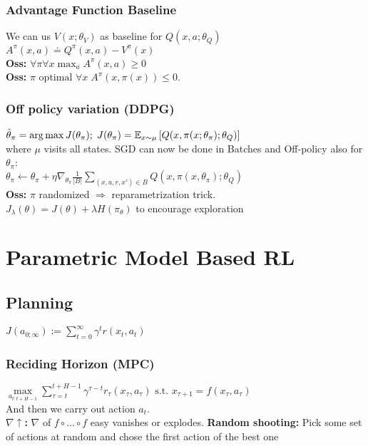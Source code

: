 \subsubsection{Advantage Function Baseline}
We can us $V(x;\theta_V)$ as baseline for $Q(x,a;\theta_Q)$\\
$A^\pi(x,a) \doteq Q^\pi(x,a)-V^\pi(x)$\\
\textbf{Oss:} $\forall\pi \forall x \max_a A^\pi(x,a)\geq 0$\\
\textbf{Oss:} $\pi \text{ optimal } \forall x  \;A^\pi(x,\pi(x))\leq 0$.

\subsubsection{Off policy variation (DDPG)}
{\scriptsize $\hat{\theta}_\pi = \operatorname*{arg\,max} J(\theta_\pi); \; J(\theta_\pi)=\mathbb{E}_{x\sim\mu}\left[Q(x,\pi(x;\theta_\pi);\theta_Q)\right]$}\\
where $\mu$ visits all states. SGD can now be done in Batches and Off-policy also for $\theta_\pi$:\\
$\theta_\pi \gets \theta_\pi + \eta \nabla_{\theta_\pi} \frac{1}{|B|}\sum_{(x,a,r,x')\in B}Q(x,\pi(x,\theta_\pi);\theta_Q)$\\
\textbf{Oss:}
$\pi$ randomized $\Rightarrow$ reparametrization trick.\\
$J_\lambda (\theta) = J(\theta) + \lambda H(\pi_\theta)$ to encourage exploration


\section{Parametric Model Based RL}


\subsection{Planning}
$J(a_{0:\infty}) := \sum_{t=0}^\infty \gamma^t r(x_t,a_t)$

\subsubsection{Reciding Horizon (MPC)}
$\max\limits_{a_{t:t+H-1}}\sum_{\tau = t}^{t+H-1}\gamma^{\tau - t}r_\tau(x_\tau, a_\tau) \text{ s.t. } x_{\tau + 1} = f(x_\tau, a_\tau)$\\
And then we carry out action $a_t$.\\
\textbf{$\nabla \uparrow$:} $\nabla$ of $f\circ \dots \circ f$ easy vanishes or explodes.
\textbf{Random shooting:} Pick some set of actions at random and chose the first action of the best one

